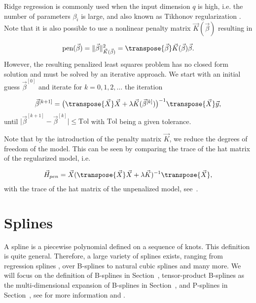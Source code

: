 Ridge regression is commonly used when the input dimension $q$ is high, i.e. the number of parameters $\beta_i$ is large, and also known as Tikhonov regularization \cite{hoerl1970ridge}. Note that it is also possible to use a nonlinear penalty matrix $\vec{K}(\vec{\beta})$ resulting in

\begin{align}
	\text{pen}(\vec{\beta}) = \lVert \vec{\beta} \rVert^2_{\vec{K}(\vec{\beta})} = \transpose{\vec{\beta}} \vec{K}(\vec{\beta}) \vec{\beta}.
\end{align}
%
However, the resulting penalized least squares problem  has no closed form solution and must be solved by an iterative approach. We start with an initial guess $\vec{\beta}^{[0]}$ and iterate for $k = 0, 1, 2, \dots$ the iteration

\begin{align} \label{eq:PLS-iterative-approach}
	\vec{\beta}^{[k+1]} = \big(\transpose{\vec{X}} \vec{X} + \lambda \vec{K}(\vec{\beta}^{[k]}) \big)^{-1} \transpose{\vec{X}} \vec{y},
\end{align}
%
until $\vert \vec{\beta}^{[k+1]} - \vec{\beta}^{[k]} \vert \le \text{Tol}$ with $\text{Tol}$ being a given tolerance.

Note that by the introduction of the penalty matrix $\vec{K}$, we reduce the degrees of freedom of the model. This can be seen by comparing the trace of the hat matrix of the regularized model, i.e.

\begin{align} \label{eq:hat-matrix-regularizated-mode}
	\vec{H}_{pen} = \vec{X} (\transpose{\vec{X}} \vec{X} + \lambda \vec{K})^{-1} \transpose{\vec{X}},
\end{align} 
%
with the trace of the hat matrix of the unpenalized model, see~.

\section{Splines} \label{sec:Splines}
	
A spline is a piecewise polynomial defined on a sequence of knots. This definition is quite general. Therefore, a large variety of splines exists, ranging from regression splines \cite{eubank1990regressionsplines}, over B-splines \cite{deBoor1978practicalGuideToSplines} to natural cubic splines and many more. We will focus on the definition of B-splines in Section~, tensor-product B-splines as the multi-dimensional expansion of B-splines in Section~, and P-splines in Section~, see for more information \cite{fahrmeir2007regression} and \cite{eilers1996flexible}.
